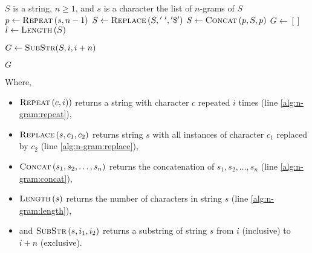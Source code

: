 		\begin{algorithm}[!ht]
			\caption{$\textsc{N-Gram}\left(S, n, s\right)$}
			\label{alg:n-gram}
			
			\begin{singlespaced}
				\begin{algorithmic}[1]
					\REQUIRE $S$ is a string, $n \ge 1$, and $s$ is a character
					\ENSURE the list of $n$-grams of $S$
					\medskip
					\STATE $p \leftarrow \textsc{Repeat}\left(s, n - 1\right)$\label{alg:n-gram:repeat}\label{alg:n-gram:p}
					\STATE $S \leftarrow \textsc{Replace}\left(S, \mathrm{'\;'}, \mathrm{'\char"24'}\right)$\label{alg:n-gram:replace}
					\STATE $S \leftarrow \textsc{Concat}\left(p, S, p\right)$\label{alg:n-gram:concat}\label{alg:n-gram:S}
					\STATE $G \leftarrow \left[\right]$\label{alg:n-gram:G}
					\STATE $l \leftarrow \textsc{Length}\left(S\right)$\label{alg:n-gram:length}
					
						\STATE $G \leftarrow \textsc{SubStr}(S, i, i + n)$
					\ENDFOR
					
					\RETURN $G$
					\medskip
					\medskip
				\end{algorithmic}
			\end{singlespaced}
			
		\end{algorithm}
		
		Where,
		 
		\begin{itemize}
			\item $\textsc{Repeat}\left(c, i)\right)$ returns a string with character $c$ repeated $i$ times (line \ref{alg:n-gram:repeat}),
			\item $\textsc{Replace}\left(s, c_1, c_2\right)$ returns string $s$ with all instances of character $c_1$ replaced by $c_2$ (line \ref{alg:n-gram:replace}),
			\item $\textsc{Concat}\left(s_1, s_2, \dotsc, s_n\right)$ returns the concatenation of $s_1, s_2, \dotsc, s_n$ (line \ref{alg:n-gram:concat}),
			\item $\textsc{Length}\left(s\right)$ returns the number of characters in string $s$ (line \ref{alg:n-gram:length}),
			\item and $\textsc{SubStr}\left(s, i_1, i_2\right)$ returns a substring of string $s$ from $i$ (inclusive) to $i + n$ (exclusive).
		\end{itemize}
		
